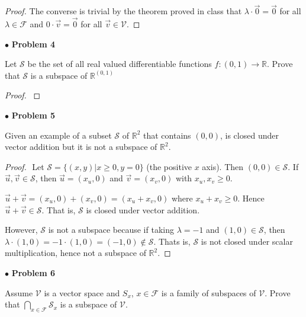\documentclass{article}
\begin{document}
\begin{proof}
The converse is trivial by the theorem proved in class that $\lambda \cdot \vec{0} = \vec{0}$ for all $\lambda \in \mathcal{F}$ and $0 \cdot \vec{v} = \vec{0}$ for all $\vec{v} \in \mathcal{V}$. 

\end{proof}


\newpage
$\bullet$ \textbf{Problem 4}
\medskip

\begin{itshape}
Let $\mathcal{S}$ be the set of all real valued differentiable functions $f:(0,1) \to \mathbb{R}$. Prove that $\mathcal{S}$ is a subspace of $\mathbb{R}^{(0,1)}$
\end{itshape}
\medskip

\begin{proof}
$ $ \newline
\end{proof}


\newpage
$\bullet$ \textbf{Problem 5}
\medskip

\begin{itshape}
Given an example of a subset $\mathcal{S}$ of $\mathbb{R}^2$ that contains $(0,0)$, is closed under vector addition but it is not a subspace of $\mathbb{R}^2$.
\end{itshape}
\medskip

\begin{proof}
$ $ \newline
Let $\mathcal{S} = \{ (x,y) | x \ge 0, y=0 \}$ (the positive $x$ axis). Then $(0,0) \in \mathcal{S}$. If $\vec{u}, \vec{v} \in \mathcal{S}$, then $\vec{u} = (x_{u},0)$ and $\vec{v} = (x_{v},0)$ with $x_{u}, x_{v} \ge 0$. 

$\vec{u} + \vec{v} = (x_{u}, 0) + (x_{v}, 0) = (x_{u} + x_{v} ,0)$ where $x_{u} + x_{v} \ge 0$. Hence $\vec{u} + \vec{v} \in \mathcal{S}$. That is, $\mathcal{S}$ is closed under vector addition.

However, $\mathcal{S}$ is not a subspace because if taking $\lambda = -1$ and $(1, 0) \in \mathcal{S}$, then $\lambda \cdot (1,0) = -1 \cdot (1,0) = (-1,0) \notin \mathcal{S}$. Thats is, $\mathcal{S}$ is not closed under scalar multiplication, hence not a subspace of $\mathbb{R}^2$.
\end{proof}


\newpage
$\bullet$ \textbf{Problem 6}
\medskip

\begin{itshape}
Assume $\mathcal{V}$ is a vector space and $S_{x}$, $x \in \mathcal{F}$ is a family of subspaces of $\mathcal{V}$. Prove that $\bigcap \limits_{x \in \mathcal{F}} \mathcal{S}_{x}$ is a subspace of $\mathcal{V}$.
\end{itshape}
\medskip
\end{document}
